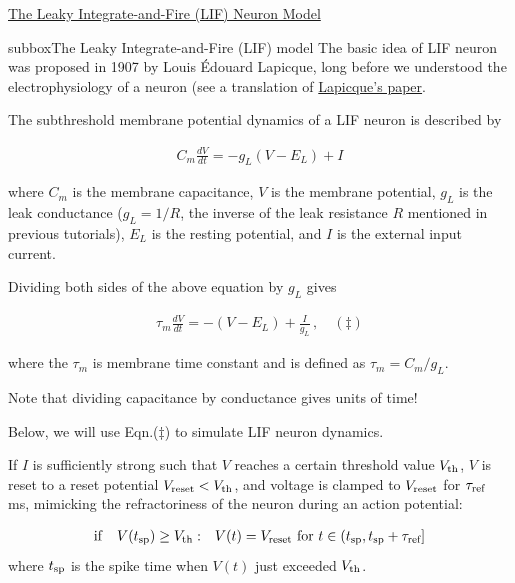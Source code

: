 \clearpage
\begin{textbox}{\href{https://compneuro.neuromatch.io/tutorials/W1D4_GeneralizedLinearModels/student/W1D4_Tutorial1.html}{The Leaky Integrate-and-Fire (LIF) Neuron Model } }
\begin{subbox}{subbox}{The Leaky Integrate-and-Fire (LIF) model}
\scriptsize
The basic idea of LIF neuron was proposed in 1907 by Louis Édouard Lapicque, long before we understood the electrophysiology of a neuron (see a translation of \href{https://pubmed.ncbi.nlm.nih.gov/17968583/}{Lapicque's paper}. 

The subthreshold membrane potential dynamics of a LIF neuron is described by

\begin{eqnarray}
C_m\frac{dV}{dt} = -g_L(V-E_L) + I
\end{eqnarray}

where $C_m$ is the membrane capacitance, $V$ is the membrane potential, $g_L$ is the leak conductance ($g_L = 1/R$, the inverse of the leak resistance $R$ mentioned in previous tutorials), $E_L$ is the resting potential, and $I$ is the external input current. 

Dividing both sides of the above equation by $g_L$ gives

\begin{align}
\tau_m\frac{dV}{dt} = -(V-E_L) + \frac{I}{g_L}\,,\quad (\ddagger)
\end{align}

where the $\tau_m$ is membrane time constant and is defined as $\tau_m=C_m/g_L$. 

Note that dividing capacitance by conductance gives units of time! 

Below, we will use Eqn.($\ddagger$) to simulate LIF neuron dynamics. 

If $I$ is sufficiently strong such that $V$ reaches a certain threshold value $V_{\rm th}$, $V$ is reset to a reset potential $V_{\rm reset}< V_{\rm th}$, and voltage is clamped to $V_{\rm reset}$ for $\tau_{\rm ref}$ ms, mimicking the refractoriness of the neuron during an action potential:

\begin{eqnarray*}
\mathrm{if}\quad V(t_{\text{sp}})\geq V_{\rm th}&:& V(t)=V_{\rm reset} \text{  for } t\in(t_{\text{sp}}, t_{\text{sp}} + \tau_{\text{ref}}]
\end{eqnarray*}
where $t_{\rm sp}$ is the spike time when $V(t)$ just exceeded $V_{\rm th}$.


\end{subbox}
\end{textbox}
